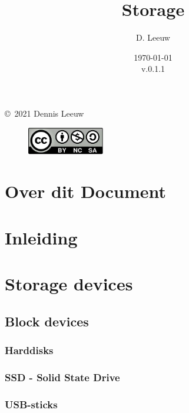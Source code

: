 \documentclass[a4paper,12pt,twoside,openright,titlepage]{book}
\author{D. Leeuw}
\title{Storage}
\date{\today\\v.0.1.1}
\begin{document}

\maketitle

\copyright\ 2021 Dennis Leeuw\\

\begin{figure}
\includegraphics[width=0.3\textwidth]{CC-BY-SA-NC.png}
\end{figure}

\bigskip




\frontmatter
\chapter{Over dit Document}



\tableofcontents

\mainmatter
\chapter{Inleiding}


\chapter{Storage devices}
\section{Block devices}

\subsection{Harddisks}

\subsection{SSD - Solid State Drive}
\subsection{USB-sticks}
\end{document}
